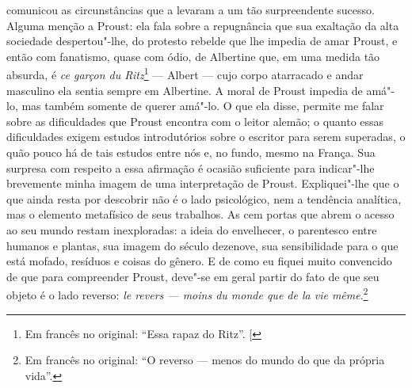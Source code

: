comunicou as circunstâncias que a levaram a um tão surpreendente
sucesso. Alguma menção a Proust: ela fala sobre a repugnância que sua
exaltação da alta sociedade despertou"-lhe, do protesto rebelde que
lhe impedia de amar Proust, e então com fanatismo, quase com ódio, de
Albertine que, em uma medida tão absurda, é \emph{ce garçon du Ritz}\footnote{Em francês no original: ``Essa rapaz do Ritz''. {[}\versal{N.~T.}{]}}
--- Albert --- cujo corpo atarracado e andar masculino ela sentia sempre
em Albertine. A moral de Proust impedia de amá"-lo, mas também somente de
querer amá"-lo. O que ela disse, permite me falar sobre as dificuldades
que Proust encontra com o leitor alemão; o quanto essas dificuldades
exigem estudos introdutórios sobre o escritor para serem superadas, o
quão pouco há de tais estudos entre nós e, no fundo, mesmo na França. Sua
surpresa com respeito a essa afirmação é ocasião suficiente para
indicar"-lhe brevemente minha imagem de uma interpretação de Proust.
Expliquei"-lhe que o que ainda resta por descobrir não é o lado
psicológico, nem a tendência analítica, mas o elemento metafísico de
seus trabalhos. As cem portas que abrem o acesso ao seu mundo restam
inexploradas: a ideia do envelhecer, o parentesco entre humanos e
plantas, sua imagem do século dezenove, sua sensibilidade para o que
está mofado, resíduos e coisas do gênero. E de como eu fiquei muito
convencido de que para compreender Proust, deve"-se em geral partir do
fato de que seu objeto é o lado reverso: \emph{le revers --- moins du
monde que de la vie même}.\footnote{Em francês no original: ``O reverso --- menos do mundo do que da própria vida''. \versal{[N.~T.]}}

